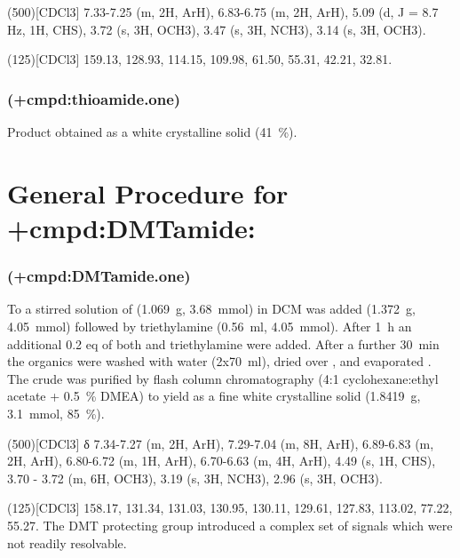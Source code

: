 {\NMR(500)[CDCl3] 7.33-7.25 (m, 2H, ArH), 6.83-6.75 (m, 2H, ArH), 5.09 (d, J = 8.7 Hz, 1H, CHS), 3.72 (s, 3H, OCH3), 3.47 (s, 3H, NCH3), 3.14 (s, 3H, OCH3).

(125)[CDCl3] 159.13, 128.93, 114.15, 109.98, 61.50, 55.31, 42.21, 32.81.

    \subsubsection{ (\cmpd+{cmpd:thioamide.one})}
    Product  obtained as a white crystalline solid (\SI{41}{\percent}).


\section{General Procedure for \cmpd+{cmpd:DMTamide}:}
\subsubsection{ (\cmpd+{cmpd:DMTamide.one})}

To a stirred solution of  (\SI{1.069}{\gram}, \SI{3.68}{\milli\mol}) in DCM was added  (\SI{1.372}{\gram}, \SI{4.05}{\milli\mol}) followed by triethylamine (\SI{0.56}{\milli\litre}, \SI{4.05}{\milli\mol}). After \SI{1}{\hour} an additional 0.2 eq of both  and triethylamine were added. After a further \SI{30}{\minute} the organics were washed with water (2x\SI{70}{\milli\litre}), dried over , and evaporated \invacuo. The crude was purified by flash column chromatography (4:1 cyclohexane:ethyl acetate + \SI{0.5}{\percent} DMEA) to yield  as a fine white crystalline solid (\SI{1.8419}{\gram}, \SI{3.1}{\milli\mol}, \SI{85}{\percent}).

\NMR(500)[CDCl3] δ 7.34-7.27 (m, 2H, ArH), 7.29-7.04 (m, 8H, ArH), 6.89-6.83 (m, 2H, ArH), 6.80-6.72 (m, 1H, ArH), 6.70-6.63 (m, 4H, ArH), 4.49 (s, 1H, CHS), 3.70 - 3.72 (m, 6H, OCH3), 3.19 (s, 3H, NCH3), 2.96 (s, 3H, OCH3).

(125)[CDCl3] 158.17, 131.34, 131.03, 130.95, 130.11, 129.61, 127.83, 113.02, 77.22, 55.27. The DMT protecting group introduced a complex set of signals which were not readily resolvable.

}
